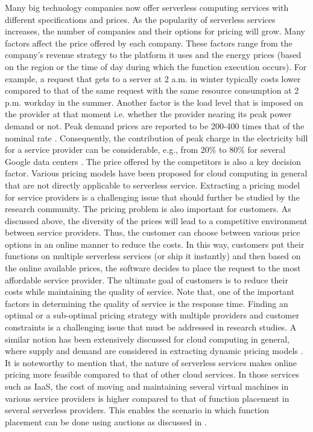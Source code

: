 Many big technology companies now offer serverless computing services with different specifications and prices. As the popularity of serverless services increases, the number of companies and their options for pricing will grow. Many factors affect the price offered by each company. These factors range from the company's revenue strategy to the platform it uses and the energy prices (based on the region or the time of day during which the function execution occurs). For example, a request that gets to a server at 2 a.m. in winter typically costs lower compared to that of the same request with the same resource consumption at 2 p.m. workday in the summer. Another factor is the load level that is imposed on the provider at that moment i.e. whether the provider nearing its peak power demand or not. Peak demand prices are reported to be 200-400 times that of the nominal rate . Consequently, the contribution of peak charge in the electricity bill for a service provider can be considerable, e.g., from 20\% to 80\% for several Google data centers . The price offered by the competitors is also a key decision factor. Various pricing models have been proposed for cloud computing in general  that are not directly applicable to serverless service. Extracting a pricing model for service providers is a challenging issue that should further be studied by the research community.
The pricing problem is also important for customers. As discussed above, the diversity of the prices will lead to a competitive environment between service providers. Thus, the customer can choose between various price options in an online manner to reduce the costs. In this way, customers put their functions on multiple serverless services (or ship it instantly) and then based on the online available prices, the software decides to place the request to the most affordable service provider. The ultimate goal of customers is to reduce their costs while maintaining the quality of service. Note that, one of the important factors in determining the quality of service is the response time.
Finding an optimal or a sub-optimal pricing strategy with multiple providers and customer constraints is a challenging issue that must be addressed in research studies. A similar notion has been extensively discussed for cloud computing in general, where supply and demand are considered in extracting dynamic pricing models .
It is noteworthy to mention that, the nature of serverless services makes online pricing more feasible compared to that of other cloud services. In those services such as IaaS, the cost of moving and maintaining several virtual machines in various service providers is higher compared to that of function placement in several serverless providers. This enables the scenario in which function placement can be done using auctions as discussed in .
